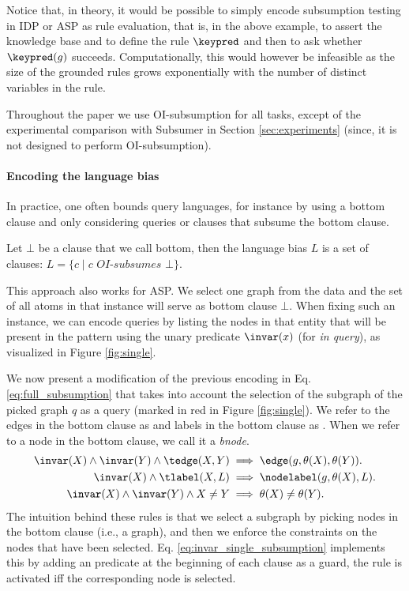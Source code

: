 Notice that, in theory, it would be possible to simply encode subsumption testing 
in IDP or ASP as rule evaluation, that is, in the above example, to assert the knowledge base and to define the rule $\keypred$ and then to ask whether $\keypred(g)$ succeeds. 
Computationally, this would however be infeasible as the size of the grounded rules 
grows exponentially with the number of distinct variables in the rule.

Throughout the paper we use OI-subsumption for all tasks, except of the experimental comparison with Subsumer in Section \ref{sec:experiments} (since, it is not designed to perform OI-subsumption).

\paragraph{Encoding the language bias}
In practice, one often bounds query languages, for instance by using a bottom clause and only considering queries or clauses that subsume the bottom clause. 

\begin{definition}
  Let $\bot$ be a clause that we call bottom, then the language bias $L$ is a set of clauses: $L = \{ c \mid c \textit{ OI-subsumes } \bot\}$.
\end{definition}

This approach also works for ASP. We select one graph from the data and the set of all atoms in that instance will serve as bottom clause $\bot$. When fixing such an instance, we can encode queries by listing the nodes in that entity that will be present in the pattern using the unary predicate $\invar(x)$ (for \textit{in query}), as visualized in Figure \ref{fig:single}.

We now present a modification of the previous encoding in Eq. \ref{eq:full_subsumption} that takes into account the selection of the subgraph of the picked graph $q$ as a query (marked in red in Figure \ref{fig:single}). We refer to the edges in the bottom clause as \tedge and labels in the bottom clause as \tlabel. When we refer to a node in the bottom clause, we call it a \textit{bnode}.
\begin{equation}
\begin{aligned}
  \invar(X) \wedge \invar(Y) \wedge \tedge(X,Y) &\implies \edge(g,\theta(X), \theta(Y)).  \\
  \invar(X) \wedge \tlabel(X,L) &\implies \nodelabel(g,\theta(X),L). \\
  \invar(X) \wedge \invar(Y) \wedge X \neq Y &\implies \theta(X) \neq \theta(Y).
\end{aligned}
  \label{eq:invar_single_subsumption}
\end{equation}
The intuition behind these rules is that we select a subgraph by picking nodes in the bottom clause (i.e., a graph), and then we enforce the constraints on the nodes that have been selected. Eq. \ref{eq:invar_single_subsumption} implements this by adding an \invar predicate at the beginning of each clause as a guard, the rule is activated iff the corresponding node is selected.
\
